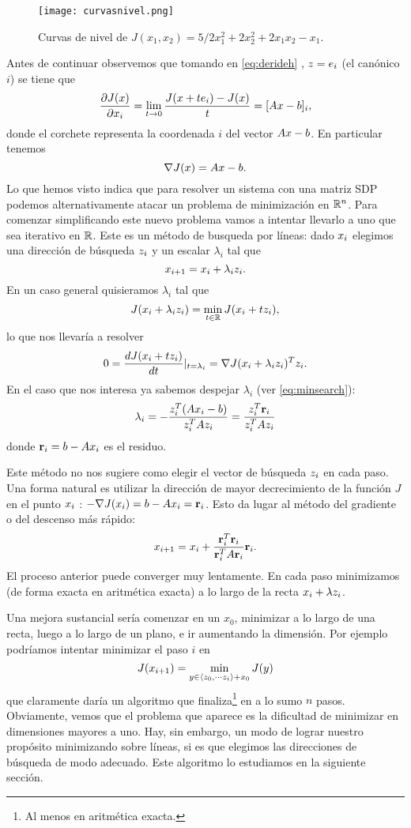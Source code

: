\begin{figure}[h]
\centering\texttt{[image: curvasnivel.png]}
\label{fig:curvasdeJ}
\caption{Curvas de nivel de $
J(x_1,x_2)=5/2x_1^2+2x_2^2+2x_1x_2-x_1
$.}
\end{figure}
\tcc
Antes de continuar observemos que tomando en \eqref{eq:derideh} , $\zb=\eb_i$ (el canónico $i$) se tiene que
$$\frac{\partial J(\xb)}{\partial x_i}=\lim_{t\to 0} \frac{J(\xb+t\eb_i)-J(\xb)}{t}=[\Ab\xb-\bb]_i,$$
donde el corchete representa la coordenada $i$ del vector $\Ab\xb-\bb$. En particular tenemos
$$
\nabla J(\xb)=\Ab\xb-\bb.
$$
\etcc
Lo que hemos visto indica que para resolver un sistema con una matriz SDP podemos alternativamente atacar un problema de minimización en $\mathbb R^{n}$. Para comenzar simplificando este nuevo problema vamos a intentar llevarlo a uno que sea iterativo en $\mathbb R$. Este es un m\'etodo de busqueda por líneas: dado $\xb_i$ elegimos una dirección de búsqueda $\zb_i$ y un escalar $\lambda_i$ tal que
$$
\xb_{i+1}=\xb_i+\lambda_i\zb_i.
$$
En un caso general quisieramos $\lambda_i$ tal que
$$
J(\xb_{i}+\lambda_i\zb_i )=\min_{t\in \R}J(\xb_i+t\zb_i),
$$
lo que nos llevaría a resolver
$$
0=\frac{dJ(\xb_{i}+t\zb_i )}{dt}|_{t=\lambda_i}=\nabla J(\xb_{i}+\lambda_i\zb_i )^T\zb_i.
$$
En el caso que nos interesa ya sabemos despejar $\lambda_i$ (ver \eqref{eq:minsearch}):
$$
\lambda_i=-\frac{\zb_i^T(\Ab\xb_i-\bb)}{\zb_i^T\Ab\zb_i}=
\frac{\zb_i^T\rb_i}{\zb_i^T\Ab\zb_i}
$$
donde $\rb_i=\bb-\Ab\xb_i$ es el residuo.

Este método no nos sugiere como elegir el vector de búsqueda $\zb_i$ en cada paso. Una forma natural es utilizar la dirección de mayor decrecimiento de la función $J$ en el punto $\xb_i$ : $-\nabla J(\xb_i)=\bb-\Ab\xb_i=\rb_i$. Esto da lugar al método del gradiente o del descenso más rápido:
$$
\xb_{i+1}=\xb_i+\frac{\rb_i^T\rb_i}{\rb_i^T\Ab\rb_i}
\rb_i.
$$
El proceso anterior puede converger muy lentamente. En cada paso minimizamos (de forma exacta en aritmética exacta) a lo largo de la recta $\xb_i+\lambda \zb_i$.

Una mejora sustancial sería comenzar en un $x_0$, minimizar a lo largo de una recta, luego a lo largo de un plano, e ir aumentando la dimensión. Por ejemplo podríamos  intentar minimizar el paso $i$ en
$$
J(\xb_{i+1})=\min_{\yb\in \langle \zb_0,\cdots\zb_i \rangle + x_0}J(\yb)
$$
que claramente daría un algoritmo que finaliza\footnote{Al menos en aritmética exacta.} en a lo sumo $n$ pasos. Obviamente, vemos que el problema que aparece es la dificultad de minimizar en dimensiones mayores a uno. Hay, sin embargo, un modo de lograr nuestro propósito minimizando sobre líneas, si es que elegimos las direcciones de búsqueda de modo adecuado. Este algoritmo lo estudiamos en la siguiente sección.
